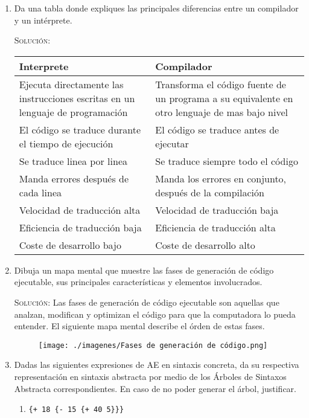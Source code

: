 \documentclass[letterpaper,11pt]{article}
\begin{document}
\begin{enumerate}
    \item Da una tabla donde expliques las principales diferencias entre un 
    compilador y un intérprete.

    \textsc{Solución:}
    
    \begin{tabular}{| p{9cm} | p{9cm} |}
        \hline
        Interprete & Compilador  \\ \hline \hline
        Ejecuta directamente las instrucciones escritas en un lenguaje de programación & Transforma el código 
        fuente de un programa a su equivalente en otro lenguaje de mas bajo nivel\\  \hline
        El código se traduce durante el tiempo de ejecución & El código se traduce antes de ejecutar  \\ \hline
        Se traduce linea por linea  & Se traduce siempre todo el código \\ \hline
        Manda errores después de cada linea  & Manda los errores en conjunto, después de la compilación \\ \hline
        Velocidad de traducción alta & Velocidad de traducción baja\\ \hline
        Eficiencia de traducción baja & Eficiencia de traducción alta\\ \hline
        Coste de desarrollo bajo & Coste de desarrollo alto\\ \hline
    \end{tabular}


    \item Dibuja un mapa mental que muestre las fases de generación de código
    ejecutable, sus principales características y elementos involucrados.

    \textsc{Solución:} Las fases de generación de código ejecutable son aquellas 
    que analzan, modifican y optimizan el código para que la computadora lo 
    pueda entender. El siguiente mapa mental describe el órden de estas fases.
    \begin{figure}[ht]
        \centering
        \texttt{[image: ./imagenes/Fases de generación de código.png]}
    \end{figure}

    \item Dadas las siguientes expresiones de AE en sintaxis concreta, da su 
    respectiva representación en sintaxis abstracta por medio de los Árboles 
    de Sintaxos Abstracta correspondientes. En caso de no poder generar el
    árbol, justificar. 
    \begin{enumerate}
        \item \texttt{\{+ 18 \{- 15 \{+ 40 5\}\}\}}
        

\end{enumerate}
\end{enumerate}
\end{document}
